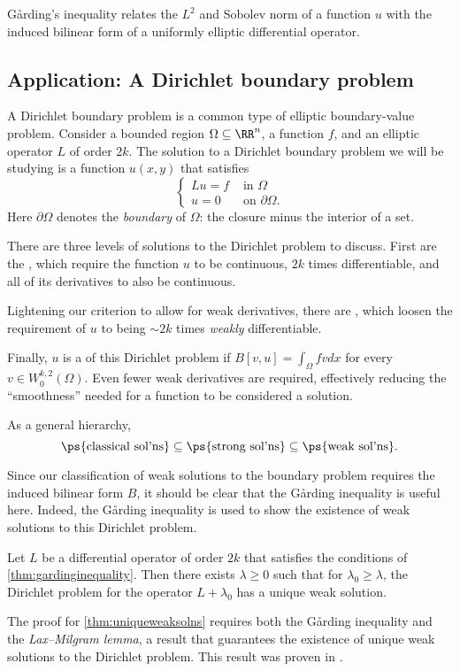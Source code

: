 \documentclass{scrartcl}
\begin{document}
G\r{a}rding's inequality relates
the $L^2$ and Sobolev norm of a function $u$ with the induced bilinear form 
of a uniformly elliptic differential operator.

\subsection{Application: A Dirichlet boundary problem}

A Dirichlet boundary problem is a common type of 
elliptic boundary-value problem.
Consider a bounded region $\Omega \subseteq \RR^n$, a function $f$, and an elliptic operator $L$ of order $2k$. The solution to a Dirichlet boundary problem we will be studying 
is a function $u(x,y)$ that satisfies 
\[
\begin{cases}
    L u = f &\text{ in }\Omega \\
    u = 0 &\text{ on }\partial \Omega.
\end{cases}
\]
Here $\partial \Omega$ denotes the \textit{boundary} of $\Omega$:
the closure minus the interior of a set.

There are three levels of solutions to the Dirichlet problem to discuss.
First are the , which require 
the function $u$ to be continuous, $2k$ times differentiable, 
and all of its derivatives to also be continuous.

Lightening our criterion to allow for weak derivatives, 
there are , which loosen the requirement 
of $u$ to being $\sim 2k$ times \textit{weakly} differentiable. 

Finally, $u$ is a 
of this Dirichlet problem if $B[v,u] = \int_{\Omega}fvdx$ for every
 $v\in W_0^{k,2}(\Omega)$.
Even fewer weak derivatives are required, 
effectively reducing the ``smoothness'' needed for a function 
to be considered a solution.

As a general hierarchy, 
\[
    \ps{\text{classical sol'ns}} \subseteq \ps{\text{strong sol'ns}} \subseteq \ps{\text{weak sol'ns}}.
\]

Since our classification of weak solutions to the boundary problem requires 
the induced bilinear form $B$, it should be clear that the G\r{a}rding 
inequality is useful here.
Indeed, the G\r{a}rding inequality is used to show the existence of weak solutions to this Dirichlet problem.
\begin{theorem}
    \label{thm:uniqueweaksolns}
    Let $L$ be a differential operator of order $2k$ that satisfies the 
    conditions of \ref{thm:gardinginequality}.
    Then there exists $\lambda \geq 0$ such that 
    for $\lambda_0 \geq \lambda$, the Dirichlet problem for 
    the operator $L+\lambda_0$ has a unique weak solution.
\end{theorem}

\begin{remark}
    The proof for \ref{thm:uniqueweaksolns} requires both the G\r{a}rding 
    inequality and the \textit{Lax–Milgram lemma}, a result that 
    guarantees the existence of unique weak solutions to the Dirichlet problem.
    This result was proven in \cite{LaxMilgram+1955+167+190}.
\end{remark}
\clearpage


\end{document}
